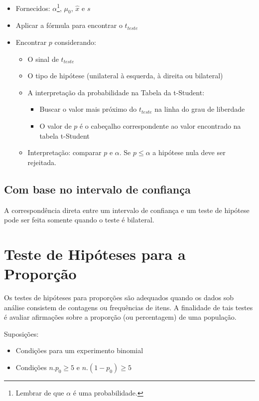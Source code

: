 \begin{itemize}
	\item Fornecidos: \(\alpha\)\footnote{Lembrar de que \(\alpha\) é uma probabilidade.}, \(\mu_0\), \(\hat{x}\) e \(s\)
	\item Aplicar a fórmula para encontrar o \(t_{teste}\)
	\item Encontrar \(p\) considerando:
	\begin{itemize}
		\item O sinal de \(t_{teste}\)
		\item O tipo de hipótese (unilateral à esquerda, à direita ou bilateral)
		\item A interpretação da probabilidade na Tabela da t-Student:
			\begin{itemize}
				\item Buscar o valor mais próximo do \(t_{teste}\) na linha do grau de liberdade
				\item O valor de \(p\) é o cabeçalho correspondente ao valor encontrado na tabela t-Student
			\end{itemize}
		\item Interpretação: comparar \(p\) e \(\alpha\). Se \(p \leq \alpha\) a hipótese nula deve ser rejeitada.
	\end{itemize}
\end{itemize}

\subsection{Com base no intervalo de confiança}

A correspondência direta entre um intervalo de confiança e um teste de hipótese pode ser feita somente quando o teste é bilateral.

\section{Teste de Hipóteses para a Proporção}

Os testes de hipóteses para proporções são adequados quando os dados sob análise consistem de contagens ou frequências de itens. A finalidade de tais testes é avaliar afirmações sobre a proporção (ou percentagem) de uma população.

Suposições:
\begin{itemize}
	\item Condições para um experimento binomial
	\item Condições \(n.p_0\geq5\) e \(n.(1-p_0)\geq5\)
\end{itemize}

